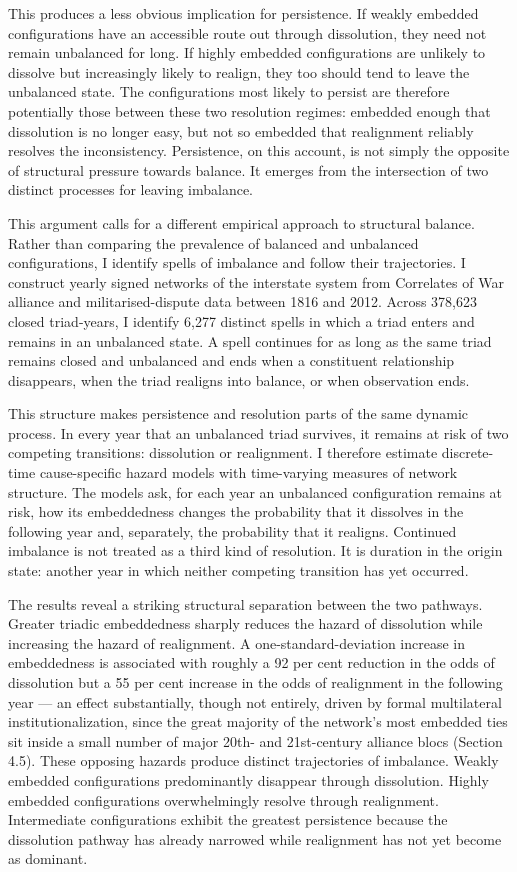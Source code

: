 \documentclass[Afour,sageh,times,doublespace]{sagej}
\begin{document}
This produces a less obvious implication for persistence. If weakly embedded configurations have an accessible route out through dissolution, they need not remain unbalanced for long. If highly embedded configurations are unlikely to dissolve but increasingly likely to realign, they too should tend to leave the unbalanced state. The configurations most likely to persist are therefore potentially those between these two resolution regimes: embedded enough that dissolution is no longer easy, but not so embedded that realignment reliably resolves the inconsistency. Persistence, on this account, is not simply the opposite of structural pressure towards balance. It emerges from the intersection of two distinct processes for leaving imbalance.

This argument calls for a different empirical approach to structural balance. Rather than comparing the prevalence of balanced and unbalanced configurations, I identify spells of imbalance and follow their trajectories. I construct yearly signed networks of the interstate system from Correlates of War alliance and militarised-dispute data between 1816 and 2012. Across 378,623 closed triad-years, I identify 6,277 distinct spells in which a triad enters and remains in an unbalanced state. A spell continues for as long as the same triad remains closed and unbalanced and ends when a constituent relationship disappears, when the triad realigns into balance, or when observation ends.

This structure makes persistence and resolution parts of the same dynamic process. In every year that an unbalanced triad survives, it remains at risk of two competing transitions: dissolution or realignment. I therefore estimate discrete-time cause-specific hazard models with time-varying measures of network structure. The models ask, for each year an unbalanced configuration remains at risk, how its embeddedness changes the probability that it dissolves in the following year and, separately, the probability that it realigns. Continued imbalance is not treated as a third kind of resolution. It is duration in the origin state: another year in which neither competing transition has yet occurred.

The results reveal a striking structural separation between the two pathways. Greater triadic embeddedness sharply reduces the hazard of dissolution while increasing the hazard of realignment. A one-standard-deviation increase in embeddedness is associated with roughly a 92 per cent reduction in the odds of dissolution but a 55 per cent increase in the odds of realignment in the following year --- an effect substantially, though not entirely, driven by formal multilateral institutionalization, since the great majority of the network's most embedded ties sit inside a small number of major 20th- and 21st-century alliance blocs (Section 4.5). These opposing hazards produce distinct trajectories of imbalance. Weakly embedded configurations predominantly disappear through dissolution. Highly embedded configurations overwhelmingly resolve through realignment. Intermediate configurations exhibit the greatest persistence because the dissolution pathway has already narrowed while realignment has not yet become as dominant.
\end{document}
